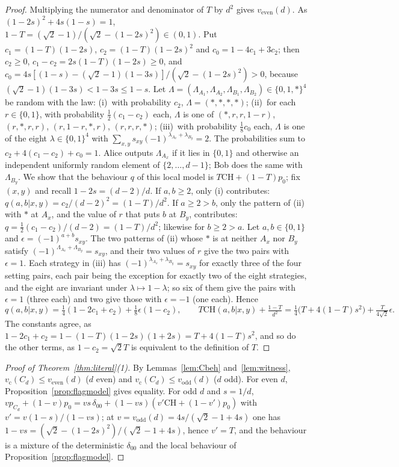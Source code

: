 \documentclass[11pt]{article}
\theoremstyle{remark}
\numberwithin{equation}{section}
\newcommand{\vc}{v_{\mathrm c}}
\newcommand{\veven}{v_{\mathrm{even}}}
\newcommand{\vodd}{v_{\mathrm{odd}}}
\newcommand{\CH}{\mathrm{CH}}
\begin{document}
\begin{proof}
Multiplying the numerator and denominator of $T$ by $d^2$ gives $\veven(d)$. As $(1-2s)^2+4s(1-s)=1$,
$1-T=(\sqrt2-1)/(\sqrt2-(1-2s)^2)\in(0,1)$. Put $c_1=(1-T)(1-2s)$, $c_2=(1-T)(1-2s)^2$ and $c_0=1-4c_1+3c_2$; then $c_2\ge0$,
$c_1-c_2=2s(1-T)(1-2s)\ge0$, and $c_0=4s[(1-s)-(\sqrt2-1)(1-3s)]/(\sqrt2-(1-2s)^2)>0$, because
$(\sqrt2-1)(1-3s)<1-3s\le1-s$. Let $\Lambda=(\Lambda_{A_1},\Lambda_{A_2},\Lambda_{B_1},\Lambda_{B_2})\in\{0,1,\ast\}^4$ be
random with the law:
(i)~with probability $c_2$, $\Lambda=(\ast,\ast,\ast,\ast)$;
(ii)~for each $r\in\{0,1\}$, with probability $\frac12(c_1-c_2)$ each, $\Lambda$ is one of $(\ast,r,r,1-r)$,
$(r,\ast,r,r)$, $(r,1-r,\ast,r)$, $(r,r,r,\ast)$;
(iii)~with probability $\frac18c_0$ each, $\Lambda$ is one of the eight $\lambda\in\{0,1\}^4$ with
$\sum_{x,y}s_{xy}(-1)^{\lambda_{A_x}+\lambda_{B_y}}=2$.
The probabilities sum to $c_2+4(c_1-c_2)+c_0=1$. Alice outputs $\Lambda_{A_x}$ if it lies in $\{0,1\}$ and otherwise an
independent uniformly random element of $\{2,\dots,d-1\}$; Bob does the same with $\Lambda_{B_y}$. We show that the
behaviour $q$ of this local model is $T\CH+(1-T)p_0$; fix $(x,y)$ and recall $1-2s=(d-2)/d$.
If $a,b\ge2$, only (i) contributes: $q(a,b|x,y)=c_2/(d-2)^2=(1-T)/d^2$. If $a\ge2>b$, only the pattern of (ii) with $\ast$
at $A_x$, and the value of $r$ that puts $b$ at $B_y$, contributes: $q=\frac12(c_1-c_2)/(d-2)=(1-T)/d^2$; likewise for
$b\ge2>a$. Let $a,b\in\{0,1\}$ and $\epsilon=(-1)^{a+b}s_{xy}$. The two patterns of (ii) whose $\ast$ is at neither $A_x$
nor $B_y$ satisfy $(-1)^{\Lambda_{A_x}+\Lambda_{B_y}}=s_{xy}$, and their two values of $r$ give the two pairs with
$\epsilon=1$. Each strategy in (iii) has $(-1)^{\lambda_{A_x}+\lambda_{B_y}}=s_{xy}$ for exactly three of the four setting
pairs, each pair being the exception for exactly two of the eight strategies, and the eight are invariant under
$\lambda\mapsto1-\lambda$; so six of them give the pairs with $\epsilon=1$ (three each) and two give those with $\epsilon=-1$
(one each). Hence
\[
q(a,b|x,y)=\tfrac14(1-2c_1+c_2)+\tfrac18\epsilon(1-c_2),\qquad
T\CH(a,b|x,y)+\tfrac{1-T}{d^2}=\tfrac14\bigl(T+4(1-T)s^2\bigr)+\tfrac{T}{4\sqrt2}\epsilon .
\]
The constants agree, as $1-2c_1+c_2=1-(1-T)(1-2s)(1+2s)=T+4(1-T)s^2$, and so do the other terms, as $1-c_2=\sqrt2T$ is
equivalent to the definition of $T$.
\end{proof}

\begin{proof}[Proof of Theorem~\ref{thm:literal}\textup{(1)}]
By Lemmas~\ref{lem:Cbeh} and~\ref{lem:witness}, $\vc(C_d)\le\veven(d)$ ($d$ even) and $\vc(C_d)\le\vodd(d)$ ($d$ odd).
For even $d$, Proposition~\ref{prop:flagmodel} gives equality. For odd $d$ and $s=1/d$,
$vp_{C_d}+(1-v)p_0=vs\,\delta_{00}+(1-vs)(v'\CH+(1-v')p_0)$ with $v'=v(1-s)/(1-vs)$; at $v=\vodd(d)=4s/(\sqrt2-1+4s)$ one
has $1-vs=(\sqrt2-(1-2s)^2)/(\sqrt2-1+4s)$, hence $v'=T$, and the behaviour is a mixture of the deterministic
$\delta_{00}$ and the local behaviour of Proposition~\ref{prop:flagmodel}.
\end{proof}
\end{document}
